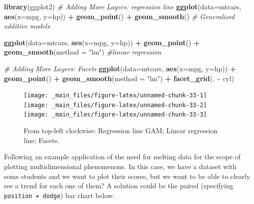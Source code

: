 \documentclass[
]{svmono}
\newenvironment{Shaded}{\begin{snugshade}}{\end{snugshade}}
\newcommand{\AttributeTok}[1]{\textcolor[rgb]{0.13,0.29,0.53}{#1}}
\newcommand{\CommentTok}[1]{\textcolor[rgb]{0.56,0.35,0.01}{\textit{#1}}}
\newcommand{\FunctionTok}[1]{\textcolor[rgb]{0.13,0.29,0.53}{\textbf{#1}}}
\newcommand{\NormalTok}[1]{#1}
\newcommand{\SpecialCharTok}[1]{\textcolor[rgb]{0.81,0.36,0.00}{\textbf{#1}}}
\newcommand{\StringTok}[1]{\textcolor[rgb]{0.31,0.60,0.02}{#1}}
\begin{document}
\begin{Shaded}
\begin{Highlighting}[]
\FunctionTok{library}\NormalTok{(ggplot2)}
\CommentTok{\# Adding More Layers: regression line}
\FunctionTok{ggplot}\NormalTok{(}\AttributeTok{data=}\NormalTok{mtcars, }\FunctionTok{aes}\NormalTok{(}\AttributeTok{x=}\NormalTok{mpg, }\AttributeTok{y=}\NormalTok{hp)) }\SpecialCharTok{+} 
  \FunctionTok{geom\_point}\NormalTok{() }\SpecialCharTok{+} 
  \FunctionTok{geom\_smooth}\NormalTok{() }\CommentTok{\# Generalized additive models}

\FunctionTok{ggplot}\NormalTok{(}\AttributeTok{data=}\NormalTok{mtcars, }\FunctionTok{aes}\NormalTok{(}\AttributeTok{x=}\NormalTok{mpg, }\AttributeTok{y=}\NormalTok{hp)) }\SpecialCharTok{+} 
  \FunctionTok{geom\_point}\NormalTok{() }\SpecialCharTok{+} 
  \FunctionTok{geom\_smooth}\NormalTok{(}\AttributeTok{method =} \StringTok{"lm"}\NormalTok{) }\CommentTok{\#linear regression}

\CommentTok{\# Adding More Layers: Facets}
\FunctionTok{ggplot}\NormalTok{(}\AttributeTok{data=}\NormalTok{mtcars, }\FunctionTok{aes}\NormalTok{(}\AttributeTok{x=}\NormalTok{mpg, }\AttributeTok{y=}\NormalTok{hp)) }\SpecialCharTok{+} 
  \FunctionTok{geom\_point}\NormalTok{() }\SpecialCharTok{+} 
  \FunctionTok{geom\_smooth}\NormalTok{(}\AttributeTok{method =} \StringTok{"lm"}\NormalTok{) }\SpecialCharTok{+} 
  \FunctionTok{facet\_grid}\NormalTok{(. }\SpecialCharTok{\textasciitilde{}}\NormalTok{ cyl)}
\end{Highlighting}
\end{Shaded}

\begin{figure}[H]
\texttt{[image: \_main\_files/figure-latex/unnamed-chunk-33-1]} \texttt{[image: \_main\_files/figure-latex/unnamed-chunk-33-2]} \texttt{[image: \_main\_files/figure-latex/unnamed-chunk-33-3]} \caption{From top-left clockwise: Regression line GAM; Linear regression line; Facets.}\label{fig:unnamed-chunk-33}
\end{figure}

Following an example application of the need for melting data for the
scope of plotting multidimensional phenomenons. In this case, we have a
dataset with some students and we want to plot their scores, but we want
to be able to clearly see a trend for each one of them? A solution could
be the paired (specifying \texttt{position\ =\ \textquotesingle{}dodge\textquotesingle{}}) bar chart below.
\end{document}
